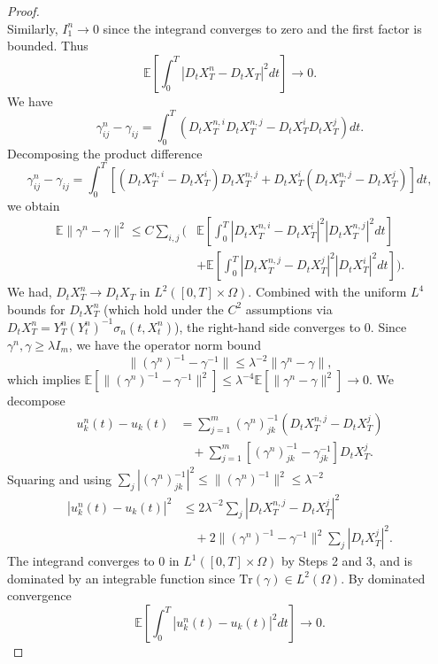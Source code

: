 \documentclass[]{interact}
\newcommand{\1}{\mathbf{1}}
\theoremstyle{plain}%
\theoremstyle{definition}
\theoremstyle{remark}
\numberwithin{equation}{section}
\begin{document}
\begin{proof}
\[\]
Similarly, \(I_1^n \to 0\) since the integrand converges to zero and the first factor is bounded. Thus
\[
\mathbb{E}\left[\int_0^T |D_t X_T^n - D_t X_T|^2 dt\right] \to 0.
\]
%
We have
\[
\gamma^n_{ij} - \gamma_{ij} = \int_0^T (D_t X_T^{n,i} D_t X_T^{n,j} - D_t X_T^i D_t X_T^j) dt.
\]
Decomposing the product difference
\[
\gamma^n_{ij} - \gamma_{ij} = \int_0^T \left[(D_t X_T^{n,i} - D_t X_T^i)D_t X_T^{n,j} + D_t X_T^i(D_t X_T^{n,j} - D_t X_T^j)\right] dt,
\]
we obtain
\begin{align*}
\mathbb{E}\|\gamma^n - \gamma\|^2 \leq C \sum_{i,j} \bigg( &\mathbb{E}\left[\int_0^T |D_t X_T^{n,i} - D_t X_T^i|^2 |D_t X_T^{n,j}|^2 dt\right] \\
&+ \mathbb{E}\left[\int_0^T |D_t X_T^{n,j} - D_t X_T^j|^2 |D_t X_T^i|^2 dt\right] \bigg).
\end{align*}
We had, \(D_t X_T^n \to D_t X_T\) in \(L^2([0,T] \times \Omega)\). Combined with the uniform \(L^4\) bounds for \(D_t X_T^n\) (which hold under the \(C^2\) assumptions via \(D_t X_T^n = Y_T^n(Y_t^n)^{-1}\sigma_n(t,X_t^n)\)), the right-hand side converges to 0.
%
Since \(\gamma^n, \gamma \geq \lambda I_m\), we have the operator norm bound
\[
\|(\gamma^n)^{-1} - \gamma^{-1}\| \leq \lambda^{-2} \|\gamma^n - \gamma\|,
\]
which implies \(\mathbb{E}[\|(\gamma^n)^{-1} - \gamma^{-1}\|^2] \leq \lambda^{-4} \mathbb{E}[\|\gamma^n - \gamma\|^2] \to 0\).
%
We decompose
\begin{align*}
u_k^n(t) - u_k(t) &= \sum_{j=1}^m (\gamma^n)^{-1}_{jk} (D_t X_T^{n,j} - D_t X_T^j) \\
&\quad + \sum_{j=1}^m [(\gamma^n)^{-1}_{jk} - \gamma^{-1}_{jk}] D_t X_T^j.
\end{align*}
%
Squaring and using \(\sum_j |(\gamma^n)^{-1}_{jk}|^2 \leq \|(\gamma^n)^{-1}\|^2 \leq \lambda^{-2}\)
\begin{align*}
|u_k^n(t) - u_k(t)|^2 &\leq 2\lambda^{-2} \sum_j |D_t X_T^{n,j} - D_t X_T^j|^2 \\
&\quad + 2\|(\gamma^n)^{-1} - \gamma^{-1}\|^2 \sum_j |D_t X_T^j|^2.
\end{align*}
%
The integrand converges to 0 in \(L^1([0,T] \times \Omega)\) by Steps 2 and 3, and is dominated by an integrable function since \(\mathrm{Tr}(\gamma) \in L^2(\Omega)\). By dominated convergence
\[
\mathbb{E}\left[\int_0^T |u_k^n(t) - u_k(t)|^2 dt\right] \to 0. 
\]

\end{proof}
\end{document}
